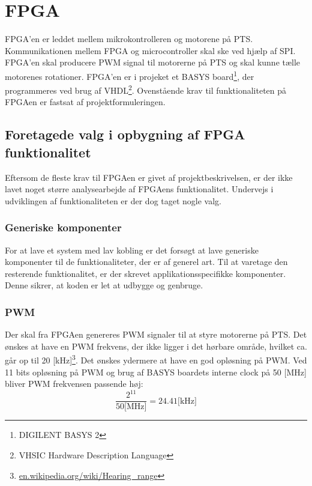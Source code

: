 \section{FPGA}
\label{sec:FPGA}
FPGA'en er leddet mellem mikrokontrolleren og motorene på PTS. 
Kommunikationen mellem FPGA og microcontroller skal ske ved hjælp af SPI. 
FPGA'en skal producere PWM signal til motorerne på PTS og skal kunne tælle motorenes rotationer. 
FPGA'en er i projeket et BASYS board\footnote{DIGILENT BASYS 2}, der programmeres ved brug af VHDL\footnote{VHSIC Hardware Description Language}.
Ovenstående krav til funktionaliteten på FPGAen er fastsat af 
projektformuleringen.

\subsection{Foretagede valg i opbygning af FPGA funktionalitet}
Eftersom de fleste krav til FPGAen er givet af projektbeskrivelsen, er der ikke 
lavet noget større analysearbejde af FPGAens funktionalitet. Undervejs i 
udviklingen af funktionaliteten er der dog taget nogle valg.


\subsubsection*{Generiske komponenter}
For at lave et system med lav kobling er det forsøgt at lave 
generiske komponenter til de funktionaliteter, der er af generel art. 
Til at varetage den resterende funktionalitet, er der skrevet applikationsspecifikke 
komponenter.
Denne sikrer, at koden er let at udbygge og genbruge.

\subsubsection*{PWM}
Der skal fra FPGAen genereres PWM signaler til at styre motorerne på PTS.
Det ønskes at have en PWM frekvens, der ikke ligger i det hørbare område, hvilket ca. går op til 20 [kHz]\footnote{\url{en.wikipedia.org/wiki/Hearing\_range}}. 
Det ønskes ydermere at have en god opløsning på PWM. 
Ved 11 bits opløsning på PWM og brug af BASYS boardets interne clock på 50 [MHz] bliver PWM frekvensen passende høj:
\begin{equation}
  \frac{2^{11}}{50 \text{[MHz]}} = 24.41 \text{[kHz]}
\end{equation}

